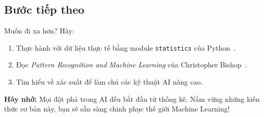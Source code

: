 \subsection{Bước tiếp theo}

Muốn đi xa hơn? Hãy:

\begin{enumerate}
\item Thực hành với dữ liệu thực tế bằng module \texttt{statistics} của Python~\cite{python2025}.
\item Đọc \textit{Pattern Recognition and Machine Learning} của Christopher Bishop~\cite{bishop2006pattern}.
\item Tìm hiểu về xác suất để làm chủ các kỹ thuật AI nâng cao.
\end{enumerate}

\textbf{Hãy nhớ:} Mọi đột phá trong AI đều bắt đầu từ thống kê. Nắm vững những kiến thức cơ bản này, bạn sẽ sẵn sàng chinh phục thế giới Machine Learning!